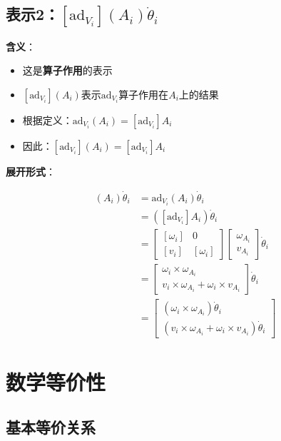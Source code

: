\documentclass[12pt,a4paper]{article}
\begin{document}
\subsection{表示2：$[\text{ad}_{V_i}](A_i) \dot{\theta}_i$}

\textbf{含义}：
\begin{itemize}
\item 这是\textbf{算子作用}的表示
\item $[\text{ad}_{V_i}](A_i)$表示$\text{ad}_{V_i}$算子作用在$A_i$上的结果
\item 根据定义：$\text{ad}_{V_i}(A_i) = [\text{ad}_{V_i}] A_i$
\item 因此：$[\text{ad}_{V_i}](A_i) = [\text{ad}_{V_i}] A_i$
\end{itemize}

\textbf{展开形式}：

\begin{align}
[\text{ad}_{V_i}](A_i) \dot{\theta}_i &= \text{ad}_{V_i}(A_i) \dot{\theta}_i \\
&= ([\text{ad}_{V_i}] A_i) \dot{\theta}_i \\
&= \begin{bmatrix}
[\omega_i] & 0 \\
[v_i] & [\omega_i]
\end{bmatrix} \begin{bmatrix}
\omega_{A_i} \\
v_{A_i}
\end{bmatrix} \dot{\theta}_i \\
&= \begin{bmatrix}
\omega_i \times \omega_{A_i} \\
v_i \times \omega_{A_i} + \omega_i \times v_{A_i}
\end{bmatrix} \dot{\theta}_i \\
&= \begin{bmatrix}
(\omega_i \times \omega_{A_i}) \dot{\theta}_i \\
(v_i \times \omega_{A_i} + \omega_i \times v_{A_i}) \dot{\theta}_i
\end{bmatrix}
\label{eq:notation2_expanded}
\end{align}

\section{数学等价性}

\subsection{基本等价关系}
\end{document}
